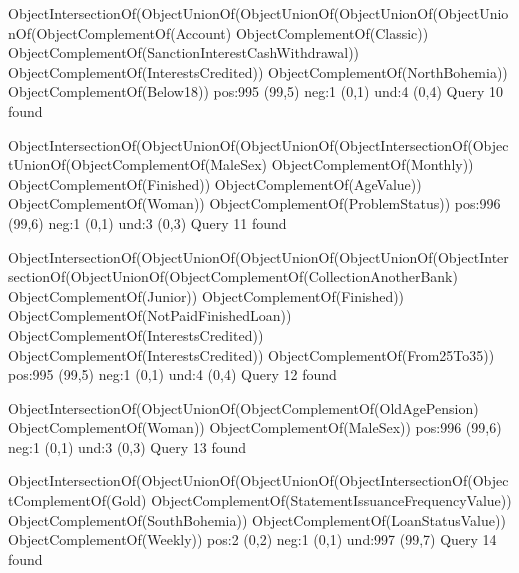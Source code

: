 ObjectIntersectionOf(ObjectUnionOf(ObjectUnionOf(ObjectUnionOf(ObjectUnionOf(ObjectComplementOf(Account) ObjectComplementOf(Classic)) ObjectComplementOf(SanctionInterestCashWithdrawal)) ObjectComplementOf(InterestsCredited)) ObjectComplementOf(NorthBohemia)) ObjectComplementOf(Below18))
pos:995 (99,5)		 neg:1 (0,1)		 und:4 (0,4)
Query 10 found

ObjectIntersectionOf(ObjectUnionOf(ObjectUnionOf(ObjectIntersectionOf(ObjectUnionOf(ObjectComplementOf(MaleSex) ObjectComplementOf(Monthly)) ObjectComplementOf(Finished)) ObjectComplementOf(AgeValue)) ObjectComplementOf(Woman)) ObjectComplementOf(ProblemStatus))
pos:996 (99,6)		 neg:1 (0,1)		 und:3 (0,3)
Query 11 found

ObjectIntersectionOf(ObjectUnionOf(ObjectUnionOf(ObjectUnionOf(ObjectIntersectionOf(ObjectUnionOf(ObjectComplementOf(CollectionAnotherBank) ObjectComplementOf(Junior)) ObjectComplementOf(Finished)) ObjectComplementOf(NotPaidFinishedLoan)) ObjectComplementOf(InterestsCredited)) ObjectComplementOf(InterestsCredited)) ObjectComplementOf(From25To35))
pos:995 (99,5)		 neg:1 (0,1)		 und:4 (0,4)
Query 12 found

ObjectIntersectionOf(ObjectUnionOf(ObjectComplementOf(OldAgePension) ObjectComplementOf(Woman)) ObjectComplementOf(MaleSex))
pos:996 (99,6)		 neg:1 (0,1)		 und:3 (0,3)
Query 13 found

ObjectIntersectionOf(ObjectUnionOf(ObjectUnionOf(ObjectIntersectionOf(ObjectComplementOf(Gold) ObjectComplementOf(StatementIssuanceFrequencyValue)) ObjectComplementOf(SouthBohemia)) ObjectComplementOf(LoanStatusValue)) ObjectComplementOf(Weekly))
pos:2 (0,2)		 neg:1 (0,1)		 und:997 (99,7)
Query 14 found
